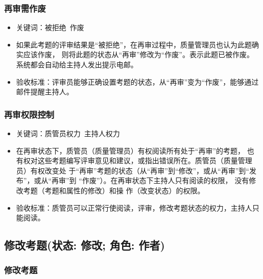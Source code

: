 \documentclass[hyperref, a4paper]{ctexart}
\providecommand{\tightlist}{%
  \setlength{\itemsep}{0pt}\setlength{\parskip}{0pt}}
\begin{document}
\hypertarget{ux518dux5ba1ux9700ux4f5cux5e9f}{%
\subsubsection{再审需作废}\label{ux518dux5ba1ux9700ux4f5cux5e9f}}

\begin{itemize}
\tightlist
\item
  关键词：被拒绝~作废
\item
  如果此考题的评审结果是``被拒绝''，在再审过程中，质量管理员也认为此题确实应该作废，
  则将此题的状态从``再审''修改为``作废''。表示此题已被作废。
  系统都会自动给主持人发出提示电邮。
\item
  验收标准：评审员能够正确设置考题的状态，从``再审''变为``作废''，能够通过邮件提醒主持人。
\end{itemize}

\hypertarget{ux518dux5ba1ux6743ux9650ux63a7ux5236}{%
\subsubsection{再审权限控制}\label{ux518dux5ba1ux6743ux9650ux63a7ux5236}}

\begin{itemize}
\tightlist
\item
  关键词：质管员权力~主持人权力
\item
  在再审状态下，质管员（质量管理员）有权阅读所有处于``再审''的考题， 也
  有权对这些考题编写评审意见和建议，或指出错误所在。质管员（质量管理员）有权改变处
  于``再审''考题的状态（从``再审''到``修改''，或从``再审''到``发布''，或从``再审''到
  ``作废''）。在再审状态下主持人只有阅读的权限，
  没有修改考题（考题和属性的修改）和操 作（改变状态）的权限。
\item
  验收标准：质管员可以正常行使阅读，评审，修改考题状态的权力，主持人只能阅读。
\end{itemize}

\hypertarget{ux4feeux6539ux8003ux9898ux72b6ux6001-ux4feeux6539-ux89d2ux8272-ux4f5cux8005}{%
\subsection{修改考题(状态: 修改; 角色:
作者)}\label{ux4feeux6539ux8003ux9898ux72b6ux6001-ux4feeux6539-ux89d2ux8272-ux4f5cux8005}}

\hypertarget{ux4feeux6539ux8003ux9898}{%
\subsubsection{修改考题}\label{ux4feeux6539ux8003ux9898}}
\end{document}
